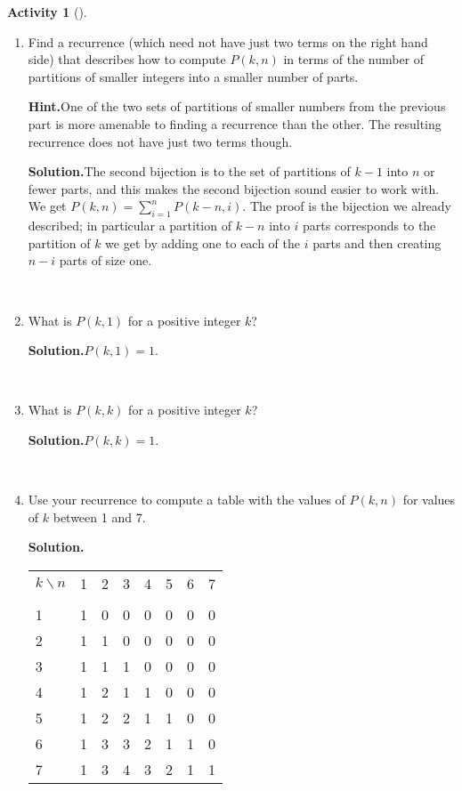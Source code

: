 \documentclass[10pt,]{book}
\theoremstyle{plain}
\theoremstyle{definition}
\newtheorem{activity}[project]{Activity}
\numberwithin{equation}{chapter}
\newcommand{\hrulethin}  {\noalign{\hrule height 0.04em}}
\begin{document}
\begin{activity}[]
\begin{enumerate}[label=(\alph*)]
~\par
\item Find a recurrence (which need not have just two terms on the right hand side) that describes how to compute \(P(k,n)\) in terms of the number of partitions of smaller integers into a smaller number of parts.%
\par\medskip\noindent%
\textbf{Hint.}\quad One of the two sets of partitions of smaller numbers from the previous part is more amenable to finding a recurrence than the other. The resulting recurrence does not have just two terms though.%
\par\medskip\noindent%
\textbf{Solution.}\quad The second bijection is to the set of partitions of \(k-1\) into \(n\) or fewer parts, and this makes the second bijection sound easier to work with. We get \(P(k,n)=\sum_{i=1}^n P(k-n,i)\). The proof is the bijection we already described; in particular a partition of \(k-n\) into \(i\) parts corresponds to the partition of \(k\) we get by adding one to each of the \(i\) parts and then creating \(n-i\) parts of size one.%

~\par
\item What is \(P(k,1)\) for a positive integer \(k\)?%
\par\medskip\noindent%
\textbf{Solution.}\quad \(P(k,1)=1\).%

~\par
\item What is \(P(k,k)\) for a positive integer \(k\)?%
\par\medskip\noindent%
\textbf{Solution.}\quad \(P(k,k)=1\).%

~\par
\item Use your recurrence to compute a table with the values of \(P(k,n)\) for values of \(k\) between 1 and 7.%
\par\medskip\noindent%
\textbf{Solution.}\quad \begin{tabular}{llllllll}
\(k\backslash n\)&1&2&3&4&5&6&7\tabularnewline[0pt]
&&&&&&&\tabularnewline\hrulethin
1&1&0&0&0&0&0&0\tabularnewline[0pt]
2&1&1&0&0&0&0&0\tabularnewline[0pt]
3&1&1&1&0&0&0&0\tabularnewline[0pt]
4&1&2&1&1&0&0&0\tabularnewline[0pt]
5&1&2&2&1&1&0&0\tabularnewline[0pt]
6&1&3&3&2&1&1&0\tabularnewline[0pt]
7&1&3&4&3&2&1&1
\end{tabular}


\end{enumerate}
\end{activity}
\end{document}
